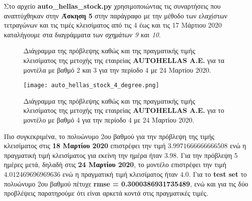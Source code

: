 \documentclass[Second Project.tex]{subfiles}
\begin{document}
Στο αρχείο \textlatin{\textbf{auto\_hellas\_stock.py}} χρησιμοποιώντας τις συναρτήσεις που αναπτύχθηκαν στην 
\textbf{Άσκηση 5} στην παράγραφο με την μέθοδο των ελαχίστων τετραγώνων και τις τιμές κλεισίματος από τις 4 έως 
και τις 17 Μάρτιου 2020 καταλήγουμε στα διαγράμματα των \textit{σχημάτων 9 και 10}.  
\begin{figure}[h!]
    \centering
    \captionsetup{justification=centering}
    \quad
    \caption{ Διάγραμμα της πρόβλεψης καθώς και της πραγματικής τιμής κλεισίματος της μετοχής της εταιρείας 
    \textlatin{\textbf{AUTOHELLAS A.E.}} για τα μοντέλα με βαθμό 2 και 3 για την περίοδο 4 με 24 Μαρτίου 2020. }
\end{figure}
\vspace{10px}
\begin{figure}[h!]
    \centering
    \captionsetup{justification=centering}
    \begin{center}
        \texttt{[image: auto\_hellas\_stock\_4\_degree.png]}    
        \caption{Διάγραμμα της πρόβλεψης καθώς και της πραγματικής τιμής κλεισίματος της μετοχής της εταιρείας 
        \textlatin{\textbf{AUTOHELLAS A.E.}} για το μοντέλο με βαθμό 4 για την περίοδο 4 με 24 Μαρτίου 2020.}
    \end{center}
\end{figure}

Πιο συγκεκριμένα, το πολυώνυμο 2ου βαθμού για την πρόβλεψη της τιμής κλεισίματος στις \textbf{18 Μαρτίου 2020} 
επιστρέφει την τιμή $3.9971666666666508$ ενώ η πραγματική τιμή κλεισίματος για εκείνη την ημέρα ήταν
$3.98$. Για την πρόβλεψη 5 ημέρες μετά, δηλαδή στις \textbf{24 Μαρτίου 2020}, το μοντέλο επιστρέφει την τιμή 
$4.012469696969636$ ενώ η πραγματική τιμή κλεισίματος ήταν $4.0$. Για το \textlatin{\textbf{test set}} το
πολυώνυμο 2ου βαθμού πέτυχε \textbf{\textlatin{rmse} = 0.3000386931735489}, ενώ και για τις δύο προβλέψεις παρατηρούμε
ότι είναι αρκετά κοντά στις πραγματικές τιμές. 
\end{document}
